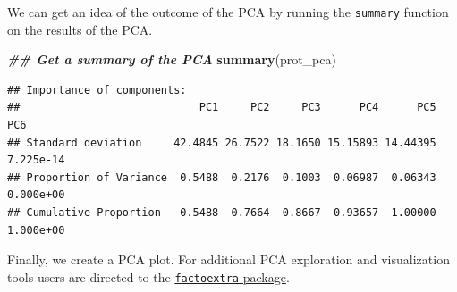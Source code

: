\documentclass[9pt,a4paper,]{extarticle}
\newenvironment{Shaded}{\begin{snugshade}}{\end{snugshade}}
\newcommand{\DocumentationTok}[1]{\textcolor[rgb]{0.56,0.35,0.01}{\textbf{\textit{#1}}}}
\newcommand{\FunctionTok}[1]{\textcolor[rgb]{0.13,0.29,0.53}{\textbf{#1}}}
\newcommand{\NormalTok}[1]{#1}
\begin{document}
We can get an idea of the outcome of the PCA by running the \texttt{summary} function
on the results of the PCA.

\begin{Shaded}
\begin{Highlighting}[]
\DocumentationTok{\#\# Get a summary of the PCA}
\FunctionTok{summary}\NormalTok{(prot\_pca)}
\end{Highlighting}
\end{Shaded}

\begin{verbatim}
## Importance of components:
##                            PC1     PC2     PC3      PC4      PC5       PC6
## Standard deviation     42.4845 26.7522 18.1650 15.15893 14.44395 7.225e-14
## Proportion of Variance  0.5488  0.2176  0.1003  0.06987  0.06343 0.000e+00
## Cumulative Proportion   0.5488  0.7664  0.8667  0.93657  1.00000 1.000e+00
\end{verbatim}

Finally, we create a PCA plot. For additional PCA exploration and visualization
tools users are directed to the \href{https://cran.r-project.org/web/packages/factoextra/index.html}{\texttt{factoextra} package}.
\end{document}
